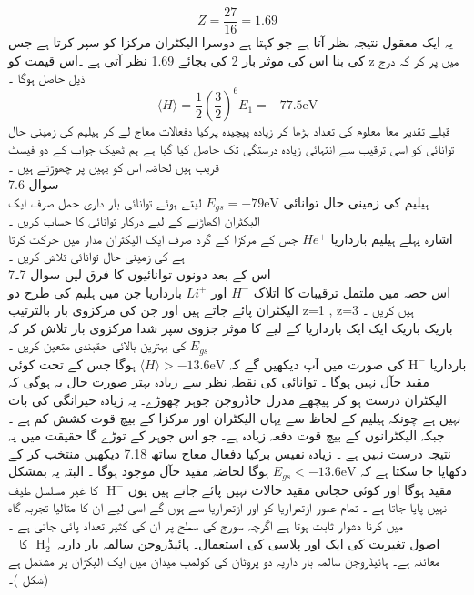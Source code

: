 \[Z=\frac{27}{16}=1.69\]
یہ ایک معقول نتیجہ نظر آتا ہے جو کہتا ہے دوسرا الیکٹران مرکزا کو سپر کرتا ہے جس کی بنا اس کی موثر بار 2 کی بجائے 1.69 نظر آتی ہے ۔اس قیمت کو z میں پر کر کہ درج ذیل حاصل ہوگا ۔\\
\[\langle H \rangle =\frac{1}{2}(\frac{3}{2})^{6}E_{1}=-77.5\text{eV}\]
قبلے تقدیر معا معلوم کی تعداد بڑھا کر زیادہ پیچیدہ پرکیا دفعالات معاج لے کر ہیلیم کی زمینی حال توانائی کو اسی ترقیب سے انتہائی زیادہ درستگی تک حاصل کیا گیا ہے ہم ٹھیک جواب کے دو فیسٹ قریب ہیں لحاضہ اس کو یہیں پر چھوڑتے ہیں ۔\\
سوال  
7.6\\
ہیلیم کی زمینی حال توانائی 
\(E_{gs}=-79\text{eV}\)
 لیتے ہوئے توانائی بار داری حمل صرف ایک الیکٹران اکھاڑنے کے لیے درکار توانائی کا حساب کریں ۔\\
اشارہ پہلے ہیلیم بارداریا
 \(He^{+}\)
 جس کے مرکزا کے گرد صرف ایک الیکٹران مدار میں حرکت کرتا ہے کی زمینی حال توانائی تلاش کریں ۔\\
اس کے بعد دونوں توانائیوں کا فرق لیں 
سوال 7۔7
\\
اس حصہ میں ملتمل ترقیبات کا اتلاک
 \(H^{-}\)
 اور
  \(Li^{+}\)
  بارداریا جن میں ہلیم کی طرح دو الیکٹران پائے جاتے ہیں اور جن کی مرکزوی بار بالترتیب z=1 , z=3 ہیں کریں ۔\\
باریک باریک ایک ایک بارداریا کے لیے کا موثر جزوی سپر شدا مرکزوی بار تلاش کر کہ 
\(E_{gs}\)
 کی بہترین بالائی حقبندی متعین کریں ۔\\
 بارداریا
 \(\text{H}^{-}\)
  کی صورت میں آپ دیکھیں گے کہ 
  \(\langle  H \rangle  > -13.6\text{eV}\) 
  ہوگا جس کے تحت کوئی مقید حآل نہیں ہوگا ۔
توانائی کی نقطہ نظر سے زیادہ بہتر صورت حال یہ ہوگی کہ الیکٹران درست ہو کر پیچھے مدرل حاڈروجن جوہر چھوڑے۔ یہ زیادہ حیرانگی کی بات نہیں ہے چونکہ ہیلیم کے لحاظ سے یہاں الیکٹران اور مرکزا کے بیچ قوت کشش کم ہے ۔ جبکہ الیکٹرانوں کے بیچ قوت دفعہ زیادہ ہے۔
جو اس جوہر کے توڑے گا حقیقت میں یہ نتیجہ درست نہیں ہے ۔ زیادہ نفیس برکیا دفعال معاج ساتھ 
7.18
دیکھیں 
منتخب کر کے دکھایا جا سکتا ہے کہ 
\(E_{gs}<-13.6\text{eV}\)
ہوگا لحاضہ مقید حآل موجود ہوگا ۔
البتہ یہ بمشکل مقید ہوگا اور کوئی حجانی مقید حالات نہیں پائے جاتے ہیں یوں
\(\text{ H}^{-}\)
 کا غیر مسلسل طیف نہیں پایا جاتا ہے ۔
تمام عبور ازتمراریا کو اور ازتمراریا سے ہوں گے اسی لیے ان کا متالیا تجربہ گاہ میں کرنا دشوار ثابت ہوتا ہے اگرچہ سورج کی سطح پر ان کی کثیر تعداد پائی جاتی ہے ۔\\
\
اصول تغیریت کی ایک اور پلاسی کی استعمال۔ ہائیڈروجن سالمہ بار داریہ
\(\text{ H}_{2}^{+}\)
 کا معائنہ ہے۔ ہائیڈروجن سالمہ بار داریہ دو پروٹان کی کولمب  میدان میں ایک الیکڑان پر مشتمل ہے  (شکل  )۔ 
